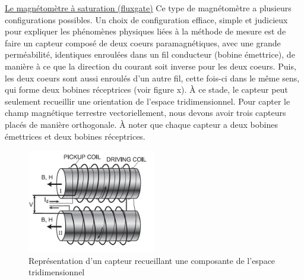 \documentclass{standalone}
\author{Bastien Gauthier-Soumis,\\
 Edward Halle-Hannan, ,\\
Massine Kadi, ,\\
Félix Pelletier, }
\begin{document}
\underline{Le magnétomètre à saturation (fluxgate)}
Ce type de magnétomètre a plusieurs configurations possibles. Un choix de configuration effiace, simple et judicieux pour expliquer les phénomènes physiques liées à la méthode de mesure est de faire un capteur composé de deux coeurs paramagnétiques, avec une grande perméabilité, identiques enroulées dans un fil conducteur (bobine émettrice), de manière à ce que la direction du courant soit inverse pour les deux coeurs. Puis, les deux coeurs sont aussi enroulés d'un autre fil, cette fois-ci dans le même sens, qui forme deux bobines réceptrices (voir figure x). À ce stade, le capteur peut seulement recueillir une orientation de l'espace tridimensionnel. Pour capter le champ magnétique terrestre vectoriellement, nous devons avoir trois capteurs placés de manière orthogonale. À noter que chaque capteur a deux bobines émettrices et deux bobines réceptrices.


\begin{figure}[h]
\begin{center}
\includegraphics[width=0.50\textwidth]{schema}
\caption{Représentation d'un capteur recueillant une composante de l'espace tridimensionnel}
\end{center}
\end{figure}
\end{document}
